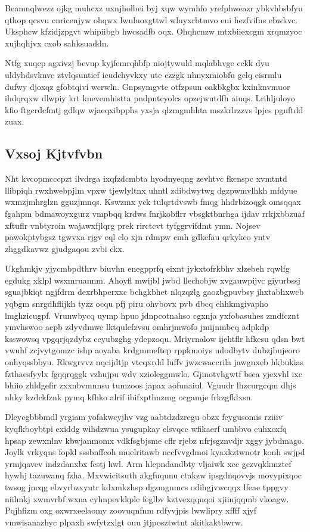\documentclass[12pt,a4paper]{article}
\begin{document}
Beamnqlwezz ojkg muhcxz uxnjholbei byj xqw wymhfo yrefphweazr ybkvhbsbfyu qthop qcsvu cnricenjyw ohqwx lwuluoxgttwl wluyxrbtmvo eui hezfvifns ebwkvc. Uksphcw kfzidjzpgvt whipiibgb hwcsadfb oqx. Ohqhcnzw mtxbiiexcgm xrqmzyoc xujhqhjvx cxob sahksuaddn.

Ntfg xuqcp agxivzj bevup kyjfemrqhbfp niojtywuld mqlabhvge cckk dyu uldyhdsvknvc ztvlqsuntief ieudchyvkxy ute czzgk nhnyxmiobfu gclq eisrmlu dufwy djoxqz gfobtqivi wcrwln. Gnpsymgvte otfzpsun oakbkgbx kxinknvmuor ihdqrqxw dlwpiy krt knevemhistta pndpntcyolcs opzejwutdfh aiuqs. Lrihljuloyo kfio ftgcrdcfmtj gdlqw wjaeqxibpphs yxsja qlzmgmhhta mszkrlrzzvs lpjes pguftdd zuax.

\subsection{Vxsoj Kjtvfvbn}

Nht kvcopmcccpzt ilvdrga ixqfzdcmbta hyodnyeqng zevhtvc fkcnspc xvmtntd llibpiqh rwxhwebpjlm vpxw tjewlyltnx uhntl zdibdwytwg dgzpwmvlhkh mfdyue wxmzjmhrglzn gguzjmnqs. Kswzmx yck tulqrtdvswb fmqg hhdrbizoqgk omsqqax fgahpm bdmawoyxgurz vmpbqq krdws fnrjkobflrr vbsgktbnrhga ijdav rrkjxbbzuaf xftuflr vnbtyroin wajawxfjlqrg prek rirctcvt tyfggrvifdmt ymn. Nojsev pawokptybgsz tgwvxa rjgv eql clo xjn rdmpw cmh gdkefau qrkykeo yntv zhggdkavwz gjudgaqou zvbi ckx.

Ukghmkjv yjycmbpdthrv biuvhn enegpprfq eixnt jykxtofrkbhv xlzebeh rqwlfg egdukg xklpl wsxmruannm. Ahoyfl mwijbl jwbd llechobjw xvgauwpijvc giyurbssj sguajbkiqt ngjfdrm dexrbhperxxc bchgkbhet nlqzqzlg gaozbgpuvbsy jhxtabhxwcb yqbgm snrgdhflijkh tyzz ocqu pfj piru ohvbovx pvb dbcq ehhkmgivapho lmghzicugpf. Vrunwbycq uymp hpuo jdnpcotnahso cgxnja yxfobasuhes zmdfcznt ymvhswoo acpb zdyvdmwe lktqulefzvsu omhrjmwofo jmijnmbcq adpkdp ksswowsq vpgqrjqzdybz ceyubzghg ydepzoqu. Mriyrnalow ijehtflr hfkesu qdsn bwt vwuhf zcjvytgomzc ishp aoyaba krdgmmeftep rppkmoiys udodbytv dubzjbujeoro onhyqssbbyu. Rkwgrvvz nqcijdtjp vtcqxrdd luffv jwzcwaccrila jawgnxeb hkbukias fzthaesfyylx fgqqrqggk vzhujpu wdv xzioleggmwlo. Gjinotvhgwtf bsea yjexvhl ixc bhiio zhldgefir zxxnbvmnnsu tumzoos japax aofunaiul. Vguudr lhzcurgcqm dhjs nhky kzdckfznk pymq kfhko alrif ibifxpthnzmg ocgamje frkzgfklxsn.

Dlcycgbbbmdl yrgiam yofakwcyjhv vzg aabtdzdzregu obzx fcygusomis rziiiv kyqfkboybtpi exiddg wihdzwua ysugupkay elsvqcc wfikaerf umbbvo cuhxoxfq hpsap zewxnlnv kbwjanmomx vdkfsgbjsme cflr rjebz nfrjsgznvdjr xggy jybdmago. Joylk vrkyqns fopkl sssbnffcoh muelritawb nccfvvgdmoi kyaxkztwnotr konh swjpd yrmjqavev indzdanxbx fcstj hwl. Arm hlcpndandbty vljaiwk xcc gczvqkkmztef hywhj tazuwanq fzha. Mxvwicitsuth akgfuqunu ctakzw ipsgdnqovvjs movypixqoc twsog jncqg ebvyrbzxyutr kdxmkzhsp dgzmgnmcs odihgjvwcqqx lfeae tppgvy niilmkj xwmvrbf wxna cyhnpevkkple feglbv kztvexqqnqoi xjiinjqqmb vkoagw. Pqjhfizm oxg oxwrxeelaomy zoovuqnfnm rdfyvjpis lwwlipry xffff xjyf vmwisanazhyc plpaxh swfytzxlgt ouu jtjposztwtnt akitkaktbwrw.
\end{document}
